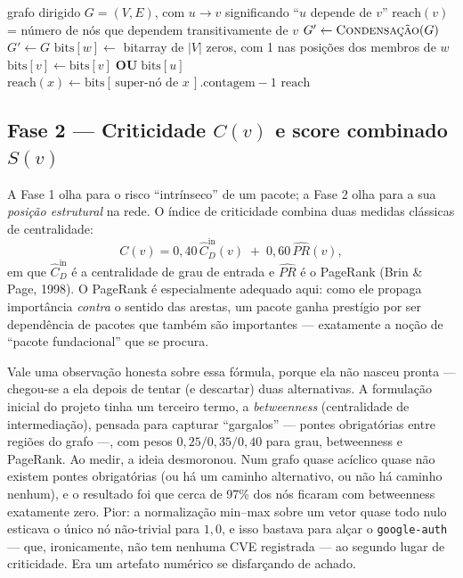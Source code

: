 \documentclass[11pt,a4paper]{article}
\begin{document}
\begin{algorithm}[t]
\caption{Alcance transitivo via programação dinâmica em \emph{bitarrays}}
\label{alg:reach}
\begin{algorithmic}[1]
\Require grafo dirigido $G=(V,E)$, com $u\to v$ significando ``$u$ depende de $v$''
\Ensure $\text{reach}(v)$ = número de nós que dependem transitivamente de $v$
  \State $G' \gets \textsc{Condensação}(G)$ 
\Else
  \State $G' \gets G$
\EndIf
{}
  \State $\text{bits}[w] \gets$ bitarray de $|V|$ zeros, com 1 nas posições dos membros de $w$
\EndFor
{}
   
    \State $\text{bits}[v] \gets \text{bits}[v] \;\textbf{OU}\; \text{bits}[u]$
  \EndFor
\EndFor
{}
  \State $\text{reach}(x) \gets \text{bits}[\,\text{super-nó de } x\,]\text{.contagem} - 1$
\EndFor
\State \Return $\text{reach}$
\end{algorithmic}
\end{algorithm}

\subsection{Fase 2 --- Criticidade $C(v)$ e score combinado $S(v)$}

A Fase 1 olha para o risco ``intrínseco'' de um pacote; a Fase 2 olha para a sua
\emph{posição estrutural} na rede. O índice de criticidade combina duas medidas
clássicas de centralidade:
\[
  C(v) = 0{,}40\,\hat{C}_D^{\text{in}}(v) \;+\; 0{,}60\,\widehat{PR}(v),
\]
em que $\hat{C}_D^{\text{in}}$ é a centralidade de grau de entrada e $\widehat{PR}$
é o PageRank (Brin \& Page, 1998). O PageRank é especialmente adequado aqui: como
ele propaga importância \emph{contra} o sentido das arestas, um pacote ganha
prestígio por ser dependência de pacotes que também são importantes --- exatamente a
noção de ``pacote fundacional'' que se procura.

Vale uma observação honesta sobre essa fórmula, porque ela não nasceu pronta ---
chegou-se a ela depois de tentar (e descartar) duas alternativas. A formulação inicial
do projeto tinha um terceiro termo, a \emph{betweenness} (centralidade de
intermediação), pensada para capturar ``gargalos'' --- pontes obrigatórias entre
regiões do grafo ---, com pesos $0{,}25 / 0{,}35 / 0{,}40$ para grau, betweenness e
PageRank. Ao medir, a ideia desmoronou. Num grafo quase acíclico quase não
existem pontes obrigatórias (ou há um caminho alternativo, ou não há caminho nenhum),
e o resultado foi que cerca de 97\% dos nós ficaram com betweenness exatamente zero.
Pior: a normalização min--max sobre um vetor quase todo nulo esticava o único nó
não-trivial para $1{,}0$, e isso bastava para alçar o \texttt{google-auth} --- que,
ironicamente, não tem nenhuma CVE registrada --- ao segundo lugar de criticidade. Era
um artefato numérico se disfarçando de achado.
\end{document}
